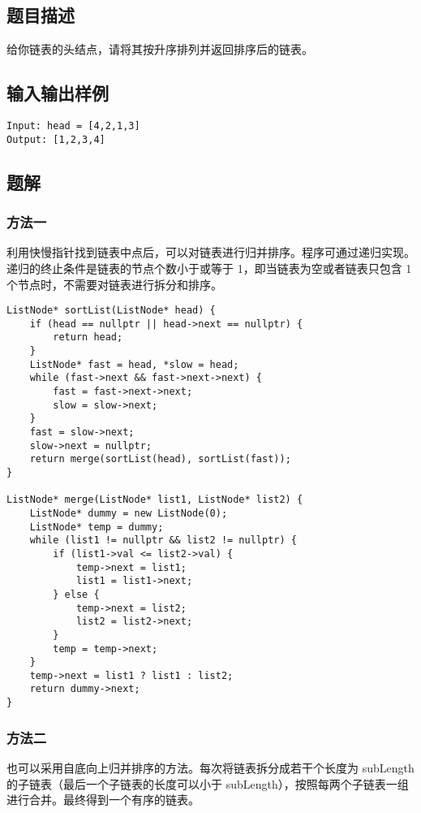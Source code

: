 \documentclass[lang=cn,10pt]{elegantbook}
\begin{document}
\subsection*{题目描述}

给你链表的头结点，请将其按升序排列并返回排序后的链表。

\subsection*{输入输出样例}

\begin{lstlisting}
Input: head = [4,2,1,3]
Output: [1,2,3,4]
\end{lstlisting}

\subsection*{题解}

\subsubsection*{方法一}

利用快慢指针找到链表中点后，可以对链表进行归并排序。程序可通过递归实现。递归的终止条件是链表的节点个数小于或等于 1，即当链表为空或者链表只包含 1 个节点时，不需要对链表进行拆分和排序。

\begin{lstlisting}
ListNode* sortList(ListNode* head) {
	if (head == nullptr || head->next == nullptr) {
		return head;
	}
	ListNode* fast = head, *slow = head;
	while (fast->next && fast->next->next) {
		fast = fast->next->next;
		slow = slow->next;
	}
	fast = slow->next;
	slow->next = nullptr;
	return merge(sortList(head), sortList(fast));
}

ListNode* merge(ListNode* list1, ListNode* list2) {
	ListNode* dummy = new ListNode(0);
	ListNode* temp = dummy;
	while (list1 != nullptr && list2 != nullptr) {
		if (list1->val <= list2->val) {
			temp->next = list1;
			list1 = list1->next;
		} else {
			temp->next = list2;
			list2 = list2->next;
		}
		temp = temp->next;
	}
	temp->next = list1 ? list1 : list2;
	return dummy->next;
}
\end{lstlisting}

\subsubsection*{方法二}

也可以采用自底向上归并排序的方法。每次将链表拆分成若干个长度为 subLength  的子链表（最后一个子链表的长度可以小于 subLength），按照每两个子链表一组进行合并。最终得到一个有序的链表。
\end{document}
